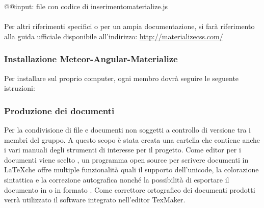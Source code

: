 \documentclass[a4paper,11pt]{article}
\begin{document}
			 @@input: file con codice di inserimentomaterialize.js
			\\
			\\
			Per altri riferimenti specifici o per un ampia documentazione, si farà riferimento alla guida ufficiale disponibile all'indirizzo: \url{http://materializecss.com/}
			
			\subsubsection{ Installazione Meteor-Angular-Materialize}
			Per installare  sul proprio computer, ogni membro dovrà seguire le seguente istruzioni:
			
			
			
			
			
	\subsubsection{Produzione dei documenti} \label{doc:prodoc}
	
	Per la condivisione di file e documenti non soggetti a controllo di versione tra i membri del gruppo. A questo scopo è stata creata una cartella che contiene anche i vari  manuali degli strumenti di interesse per il progetto.
	Come editor per i documenti viene scelto , un programma open source per scrivere documenti in \LaTeX   che offre multiple funzionalità quali il supporto dell'unicode, la colorazione sintattica e la correzione autografica nonché la possibilità di esportare il documento in  o in formato .
	Come correttore ortografico dei documenti prodotti verrà utilizzato il software \textbf{} integrato nell'editor TexMaker.
	\newpage
	
		
	
\end{document}

